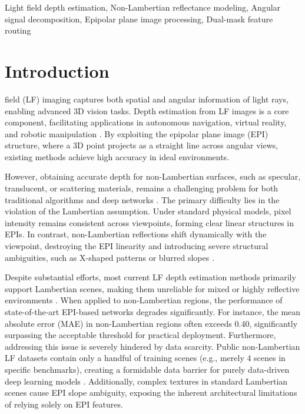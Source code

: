 \documentclass[lettersize,journal]{IEEEtran}
\begin{document}
\begin{IEEEkeywords}
Light field depth estimation, Non-Lambertian reflectance modeling, Angular signal decomposition, Epipolar plane image processing, Dual-mask feature routing
\end{IEEEkeywords}

\section{Introduction}

 field (LF) imaging captures both spatial and angular information of light rays, enabling advanced 3D vision tasks. Depth estimation from LF images is a core component, facilitating applications in autonomous navigation, virtual reality, and robotic manipulation \cite{visionappl}. By exploiting the epipolar plane image (EPI) structure, where a 3D point projects as a straight line across angular views, existing methods achieve high accuracy in ideal environments. 

However, obtaining accurate depth for non-Lambertian surfaces, such as specular, translucent, or scattering materials, remains a challenging problem for both traditional algorithms and deep networks \cite{nonlamb}. The primary difficulty lies in the violation of the Lambertian assumption. Under standard physical models, pixel intensity remains consistent across viewpoints, forming clear linear structures in EPIs. In contrast, non-Lambertian reflections shift dynamically with the viewpoint, destroying the EPI linearity and introducing severe structural ambiguities, such as X-shaped patterns or blurred slopes \cite{epistru}. 

Despite substantial efforts, most current LF depth estimation methods primarily support Lambertian scenes, making them unreliable for mixed or highly reflective environments \cite{lamberassu}. When applied to non-Lambertian regions, the performance of state-of-the-art EPI-based networks degrades significantly. For instance, the mean absolute error (MAE) in non-Lambertian regions often exceeds 0.40, significantly surpassing the acceptable threshold for practical deployment. Furthermore, addressing this issue is severely hindered by data scarcity. Public non-Lambertian LF datasets contain only a handful of training scenes (e.g., merely 4 scenes in specific benchmarks), creating a formidable data barrier for purely data-driven deep learning models \cite{nonlamb_5}. Additionally, complex textures in standard Lambertian scenes cause EPI slope ambiguity, exposing the inherent architectural limitations of relying solely on EPI features.
\end{document}
